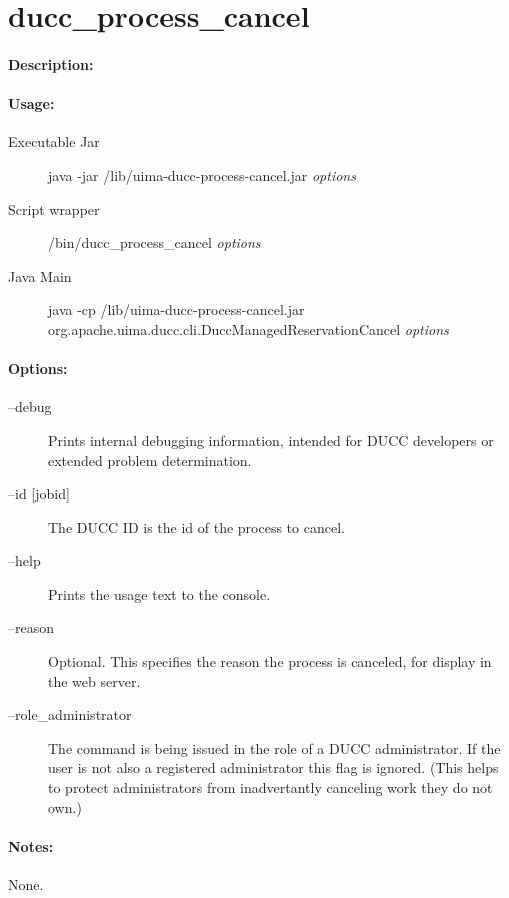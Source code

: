 \ifpdf
\else
{}
\fi
    \section{ducc\_process\_cancel}

    \paragraph{Description:}

    \paragraph{Usage:}
    \begin{description}
    \item[Executable Jar] java -jar \ducchome/lib/uima-ducc-process-cancel.jar {\em options}
    \item[Script wrapper] \ducchome/bin/ducc\_process\_cancel {\em options}
    \item[Java Main]      java -cp \ducchome/lib/uima-ducc-process-cancel.jar org.apache.uima.ducc.cli.DuccManagedReservationCancel {\em options}
    \end{description}

    \paragraph{Options:}
    \begin{description}
        \item[--debug ]          
          Prints internal debugging information, intended for DUCC developers or extended problem determination.          
        \item[--id {[jobid]}]
          The DUCC ID is the id of the process to cancel.
        \item[--help]
          Prints the usage text to the console.
        \item[--reason]
          Optional. This specifies the reason the process is canceled, for display in the web server. 
        \item[--role\_administrator] The command is being issued in the role of a DUCC administrator.
          If the user is not also a registered administrator this flag is ignored.  (This helps to
          protect administrators from inadvertantly canceling work they do not own.)
     \end{description}
        
    \paragraph{Notes:}
    None.

